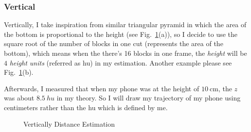 \documentclass{article}
\begin{document}
\subsubsection{Vertical}

Vertically, I take inspiration from similar triangular pyramid in which the area of the bottom is proportional to the height (see Fig.~\ref{fig:blocksAndPyramid}(a)), so I decide to use the square root of the number of blocks in one cut (represents the area of the bottom), which means when the there's 16 blocks in one frame, the \emph{height} will be $4$ \emph{height units} (referred as hu) in my estimation. Another example please see Fig.~\ref{fig:blocksAndPyramid}(b). 

Afterwards, I measured that when my phone was at the height of $10~ \mathrm{cm}$, the $z$ was about $8.5 \mathrm~{hu}$ in my theory. So I will draw my trajectory of my phone using centimeters rather than the hu which is defined by me.  

\begin{figure}[!h]
	\centering
	\hspace{0 pt}
	\caption{Vertically Distance Estimation}
	\label{fig:blocksAndPyramid}
\end{figure}
\end{document}
